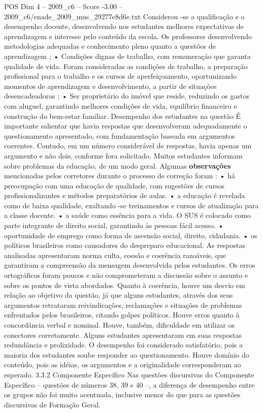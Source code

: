 \begin{textsample}{POS Dim 4 – 2009\_c6 – Score -3.00 – 2009\_c6/enade\_2009\_mus\_29277e8d6e.txt}
Considerou -se a qualificação e o desempenho docente, desenvolvendo nos estudantes melhores expectativas de aprendizagem e interesse pelo conteúdo da escola.
Os professores desenvolvendo metodologias adequadas e conhecimento pleno quanto a questões de aprendizagem ; • Condições dignas de trabalho, com remuneração que garanta qualidade de vida.
Foram consideradas as condições de trabalho, a preparação profissional para o trabalho e os cursos de aperfeiçoamento, oportunizando momentos de aprendizagem e desenvolvimento, a partir de situações desencadeadoras ; • Ser proprietário do imóvel que reside, reduzindo os gastos com aluguel, garantindo melhores condições de vida, equilíbrio financeiro e construção do bem-estar familiar.
Desempenho dos estudantes na questão É importante salientar que havia respostas que desenvolveram adequadamente o questionamento apresentado, com fundamentação baseada em argumentos coerentes.
Contudo, em um número considerável de respostas, havia apenas um argumento e não dois, conforme fora solicitado.
Muitos estudantes informam sobre problemas da educação, de um modo geral.
Algumas \textbf{observações} mencionadas pelos corretores durante o processo de correção foram : • há preocupação com uma educação de qualidade, com sugestões de cursos profissionalizantes e métodos preparatórios de aulas. • a educação é revelada como de baixa qualidade, exaltando -se treinamentos e cursos de atualização para a classe docente. • a saúde como essência para a vida.
O SUS é colocado como parte integrante de direito social, garantindo às pessoas fácil acesso. • oportunidade de emprego como forma de ascensão social, direito, cidadania. • os políticos brasileiros como causadores do despreparo educacional.
As respostas analisadas apresentaram norma culta, coesão e coerência razoáveis, que garantiram a compreensão da mensagem desenvolvida pelos estudantes.
Os erros ortográficos foram poucos e não comprometeram a discussão sobre o assunto e sobre os pontos de vista abordados.
Quanto à coerência, houve um desvio em relação ao objetivo da questão, já que alguns estudantes, através dos seus argumentos retrataram reivindicações, reclamações e situações de problemas enfrentados pelos brasileiros, citando golpes políticos.
Houve erros quanto à concordância verbal e nominal.
Houve, também, dificuldade em utilizar os conectores corretamente.
Alguns estudantes apresentaram em suas respostas redundância e prolixidade.
O desempenho foi considerado satisfatório, pois a maioria dos estudantes soube responder ao questionamento.
Houve domínio do conteúdo, pois as idéias, os argumentos e a originalidade corresponderam ao esperado. 3.3.2 Componente Específico Nas questões discursivas do Componente Específico – questões de números 38, 39 e 40 –, a diferença de desempenho entre os grupos não foi muito acentuada, inclusive menor do que para as questões discursivas de Formação Geral.

\end{textsample}
